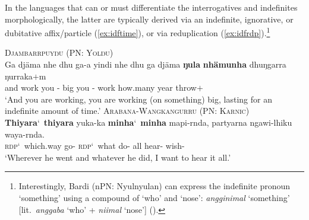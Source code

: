 \documentclass[12pt,egregdoesnotlikesansseriftitles]{scrartcl}
\begin{document}
In the languages that can or must differentiate the interrogatives and indefinites morphologically, the latter are typically derived via an indefinite, ignorative, or dubitative affix/particle (\ref{ex:idftime}), or via reduplication (\ref{ex:idfrdp}).\footnote{Interestingly, Bardi (nPN: Nyulnyulan) can express the indefinite pronoun `something' using a compound of `who' and `nose': \textit{angginimal} `something' [lit.\ \textit{anggaba} `who' + \textit{niimal} `nose'] (\citealt[321]{bowern12}).}
\begin{exe}
  \ex\label{ex:idftime} \textsc{Djambarrpuyŋu (PN: Yolŋu)}\hfill {}\\
  \gll %
  Ga djäma nhe dhu ga-a yindi nhe dhu ga djäma \textbf{ŋula} \textbf{nhämunha} dhuŋgarra ŋurraka$+$m\\
  and work you \Fut{} \Impv-\First{} big you \Fut{} \Impv-\First{} work  how.many year throw$+$\First\\
  \glt `And you are working, you are working (on something) big, lasting for an indefinite amount of time.'
  \ex\label{ex:idfrdp} \textsc{Arabana-Wangkangurru (PN: Karnic)}\hfill {}\\
  \gll \textbf{Thiyara}\char`~\textbf{thiyara} yuka-ka \textbf{minha}\char`~\textbf{minha} mapi-rnda, partyarna ngawi-lhiku waya-rnda.\\
  \textsc{rdp}\char`~which.way go-\Pst{} \textsc{rdp}\char`~what do-\Prs{} all hear-\Purp{} wish-\Prs\\
  \glt `Wherever he went and whatever he did, I want to hear it all.' %
\end{exe}
\end{document}
